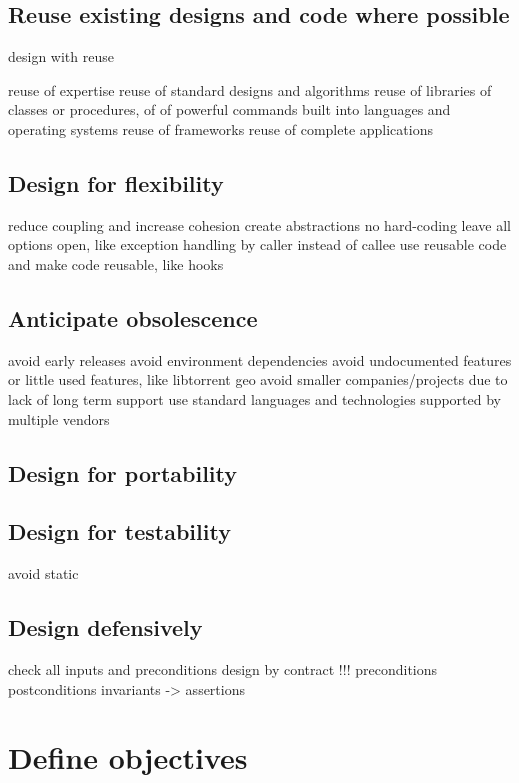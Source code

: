 \subsection{Reuse existing designs and code where possible}

design with reuse

reuse of expertise
reuse of standard designs and algorithms
reuse of libraries of classes or procedures, of of powerful commands built into languages and operating systems
reuse of frameworks
reuse of complete applications

\subsection{Design for flexibility} %

reduce coupling and increase cohesion
create abstractions
no hard-coding
leave all options open, like exception handling by caller instead of callee
use reusable code and make code reusable, like hooks

\subsection{Anticipate obsolescence}

avoid early releases
avoid environment dependencies
avoid undocumented features or little used features, like libtorrent geo
avoid smaller companies/projects due to lack of long term support
use standard languages and technologies supported by multiple vendors

\subsection{Design for portability}

\subsection{Design for testability}

avoid static

\subsection{Design defensively}

check all inputs and preconditions
design by contract !!!
preconditions
postconditions
invariants
-> assertions



\section{Define objectives} %



